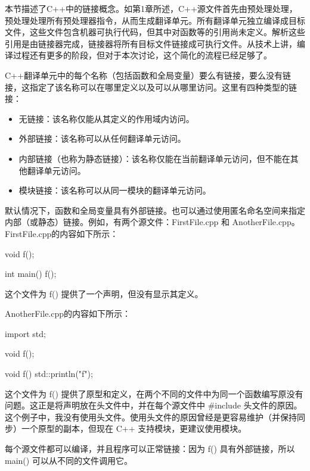 
本节描述了C++中的链接概念。如第1章所述，C++源文件首先由预处理处理，预处理处理所有预处理器指令，从而生成翻译单元。所有翻译单元独立编译成目标文件，这些文件包含机器可执行代码，但其中对函数等的引用尚未定义。解析这些引用是由链接器完成，链接器将所有目标文件链接成可执行文件。从技术上讲，编译过程还有更多的阶段，但对于本次讨论，这个简化的流程已经足够了。

C++翻译单元中的每个名称（包括函数和全局变量）要么有链接，要么没有链接，这指定了该名称可以在哪里定义以及可以从哪里访问。这里有四种类型的链接：

\begin{itemize}
\item
无链接：该名称仅能从其定义的作用域内访问。

\item
外部链接：该名称可以从任何翻译单元访问。

\item
内部链接（也称为静态链接）：该名称仅能在当前翻译单元访问，但不能在其他翻译单元访问。

\item
模块链接：该名称可以从同一模块的翻译单元访问。
\end{itemize}


默认情况下，函数和全局变量具有外部链接。也可以通过使用匿名命名空间来指定内部（或静态）链接。例如，有两个源文件：FirstFile.cpp 和 AnotherFile.cpp。FirstFile.cpp的内容如下所示：

\begin{cpp}
void f();

int main()
{
    f();
}
\end{cpp}

这个文件为 f() 提供了一个声明，但没有显示其定义。

AnotherFile.cpp的内容如下所示：

\begin{cpp}
import std;

void f();

void f()
{
    std::println("f");
}
\end{cpp}

这个文件为 f() 提供了原型和定义，在两个不同的文件中为同一个函数编写原没有问题。这正是将声明放在头文件中，并在每个源文件中 \#include 头文件的原因。这个例子中，我没有使用头文件。使用头文件的原因曾经是更容易维护（并保持同步）一个原型的副本，但现在 C++ 支持模块，更建议使用模块。

每个源文件都可以编译，并且程序可以正常链接：因为 f() 具有外部链接，所以 main() 可以从不同的文件调用它。

